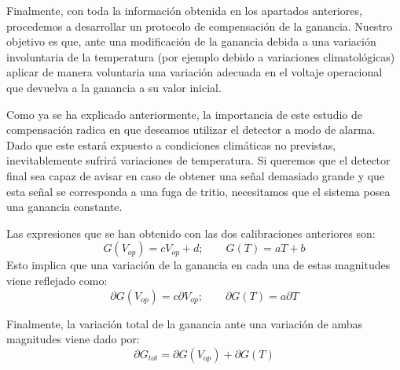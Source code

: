 Finalmente, con toda la información obtenida en los apartados anteriores, procedemos a desarrollar un protocolo de compensación de la ganancia. Nuestro objetivo es que, ante una modificación de la ganancia debida a una variación involuntaria de la temperatura (por ejemplo debido a variaciones climatológicas) aplicar de manera voluntaria una variación adecuada en el voltaje operacional que devuelva a la ganancia a su valor inicial.

Como ya se ha explicado anteriormente, la importancia de este estudio de compensación radica en que deseamos utilizar el detector  a modo de alarma. Dado que este estará expuesto a condiciones climáticas no previstas, inevitablemente sufrirá variaciones de temperatura. Si queremos que el detector final sea capaz de avisar en caso de obtener una señal demasiado grande y que esta señal se corresponda a una fuga de tritio, necesitamos que el sistema posea una ganancia constante.

Las expresiones que se han obtenido con las dos calibraciones anteriores son:
\begin{equation}
G(V_{op})=cV_{op}+d; \qquad G(T)=aT+b
\label{gananciatotal}
\end{equation}
Esto implica que una variación de la ganancia en cada una de estas magnitudes viene reflejado como:
\begin{equation}
\partial G(V_{op}) = c \partial V_{op}; \qquad \partial G(T) = a \partial T
\label{variacionparcialganancia}
\end{equation}

Finalmente, la variación total de la ganancia ante una variación de ambas magnitudes viene dado por:
\begin{equation}
\partial G_{tot} = \partial G(V_{op}) + \partial G(T)
\label{variaciontotalganancia}
\end{equation}

